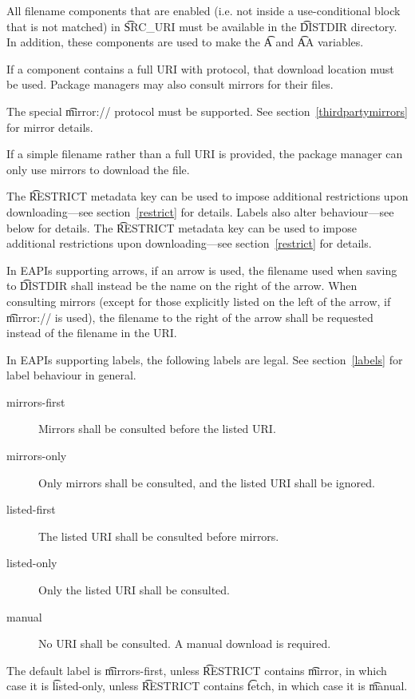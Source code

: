 All filename components that are enabled (i.e. not inside a use-conditional block that is not
matched) in \t{SRC\_URI} must be available in the \t{DISTDIR} directory. In addition, these
components are used to make the \t{A} and \t{AA} variables.

If a component contains a full URI with protocol, that download location must be used. Package
managers may also consult mirrors for their files.

The special \t{mirror://} protocol must be supported. See section~\ref{thirdpartymirrors} for mirror
details.

If a simple filename rather than a full URI is provided, the package manager can only use mirrors to
download the file.

\IFKDEBUILDELSE
{
    The \t{RESTRICT} metadata key can be used to impose additional restrictions upon downloading---see
    section~\ref{restrict} for details. Labels also alter behaviour---see below for details.
}{
    The \t{RESTRICT} metadata key can be used to impose additional restrictions upon downloading---see
    section~\ref{restrict} for details.
}

\IFKDEBUILDELSE
{
In EAPIs supporting arrows, if an arrow is used, the filename used when saving to \t{DISTDIR} shall
instead be the name on the right of the arrow. When consulting mirrors (except for those explicitly
listed on the left of the arrow, if \t{mirror://} is used), the filename to the right of the arrow
shall be requested instead of the filename in the URI.

In EAPIs supporting labels, the following labels are legal. See section~\ref{labels} for label
behaviour in general.

\begin{description}
\item[mirrors-first] Mirrors shall be consulted before the listed URI.
\item[mirrors-only] Only mirrors shall be consulted, and the listed URI shall be ignored.
\item[listed-first] The listed URI shall be consulted before mirrors.
\item[listed-only] Only the listed URI shall be consulted.
\item[manual] No URI shall be consulted. A manual download is required.
\end{description}

The default label is \t{mirrors-first}, unless \t{RESTRICT} contains \t{mirror}, in which case it is
\t{listed-only}, unless \t{RESTRICT} contains \t{fetch}, in which case it is \t{manual}.
}{
}



